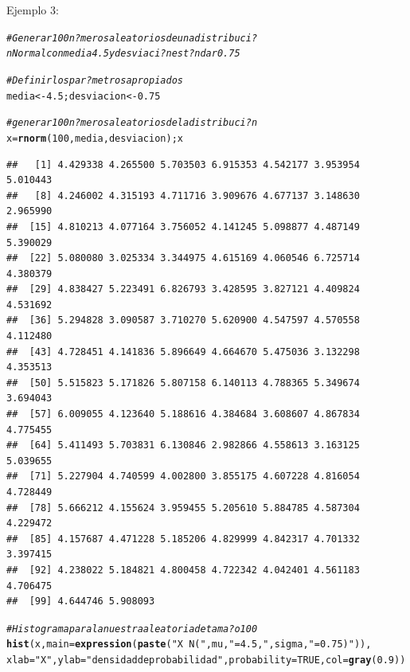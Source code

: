 \documentclass[10pt,a4paper]{article}\usepackage[]{graphicx}\usepackage[]{color}
\makeatletter
\newcommand{\hlnum}[1]{\textcolor[rgb]{0.686,0.059,0.569}{#1}}%
\newcommand{\hlstr}[1]{\textcolor[rgb]{0.192,0.494,0.8}{#1}}%
\newcommand{\hlcom}[1]{\textcolor[rgb]{0.678,0.584,0.686}{\textit{#1}}}%
\newcommand{\hlstd}[1]{\textcolor[rgb]{0.345,0.345,0.345}{#1}}%
\newcommand{\hlkwb}[1]{\textcolor[rgb]{0.69,0.353,0.396}{#1}}%
\newcommand{\hlkwc}[1]{\textcolor[rgb]{0.333,0.667,0.333}{#1}}%
\newcommand{\hlkwd}[1]{\textcolor[rgb]{0.737,0.353,0.396}{\textbf{#1}}}%
\newenvironment{kframe}{%
 \def\at@end@of@kframe{}%
 \ifinner\ifhmode%
  \def\at@end@of@kframe{\end{minipage}}%
  \begin{minipage}{\columnwidth}%
 \fi\fi%
 \def\FrameCommand##1{\hskip\@totalleftmargin \hskip-\fboxsep
 \colorbox{shadecolor}{##1}\hskip-\fboxsep
     \hskip-\linewidth \hskip-\@totalleftmargin \hskip\columnwidth}%
 \MakeFramed {\advance\hsize-\width
   \@totalleftmargin\z@ \linewidth\hsize
   \@setminipage}}%
 {\par\unskip\endMakeFramed%
 \at@end@of@kframe}
\newenvironment{knitrout}{}{} %
\makeatother
\begin{document}
Ejemplo 3: 
\begin{knitrout}
\color{fgcolor}\begin{kframe}
\begin{alltt}
\hlcom{#Generar 100 n?meros aleatorios de una distribuci?n Normal con media 4.5 y desviaci?n est?ndar 0.75 }

\hlcom{# Definir los par?metros apropiados }
\hlstd{media} \hlkwb{<-} \hlnum{4.5}\hlstd{; desviacion} \hlkwb{<-} \hlnum{0.75}

\hlcom{# generar 100 n?meros aleatorios de la distribuci?n }
\hlstd{x} \hlkwb{=} \hlkwd{rnorm}\hlstd{(}\hlnum{100}\hlstd{, media, desviacion); x}
\end{alltt}
\begin{verbatim}
##   [1] 4.429338 4.265500 5.703503 6.915353 4.542177 3.953954 5.010443
##   [8] 4.246002 4.315193 4.711716 3.909676 4.677137 3.148630 2.965990
##  [15] 4.810213 4.077164 3.756052 4.141245 5.098877 4.487149 5.390029
##  [22] 5.080080 3.025334 3.344975 4.615169 4.060546 6.725714 4.380379
##  [29] 4.838427 5.223491 6.826793 3.428595 3.827121 4.409824 4.531692
##  [36] 5.294828 3.090587 3.710270 5.620900 4.547597 4.570558 4.112480
##  [43] 4.728451 4.141836 5.896649 4.664670 5.475036 3.132298 4.353513
##  [50] 5.515823 5.171826 5.807158 6.140113 4.788365 5.349674 3.694043
##  [57] 6.009055 4.123640 5.188616 4.384684 3.608607 4.867834 4.775455
##  [64] 5.411493 5.703831 6.130846 2.982866 4.558613 3.163125 5.039655
##  [71] 5.227904 4.740599 4.002800 3.855175 4.607228 4.816054 4.728449
##  [78] 5.666212 4.155624 3.959455 5.205610 5.884785 4.587304 4.229472
##  [85] 4.157687 4.471228 5.185206 4.829999 4.842317 4.701332 3.397415
##  [92] 4.238022 5.184821 4.800458 4.722342 4.042401 4.561183 4.706475
##  [99] 4.644746 5.908093
\end{verbatim}
\begin{alltt}
\hlcom{# Histograma para la nuestra aleatoria de tama?o 100 }
\hlkwd{hist}\hlstd{(x,}\hlkwc{main}\hlstd{=}\hlkwd{expression}\hlstd{(}\hlkwd{paste}\hlstd{(}\hlstr{"X ~ N("}\hlstd{, mu,} \hlstr{" = 4.5, "}\hlstd{, sigma,} \hlstr{" = 0.75)"}\hlstd{)),}
\hlkwc{xlab}\hlstd{=}\hlstr{"X"}\hlstd{,} \hlkwc{ylab}\hlstd{=}\hlstr{"densidad de probabilidad"}\hlstd{,} \hlkwc{probability}\hlstd{=}\hlnum{TRUE}\hlstd{,} \hlkwc{col}\hlstd{=}\hlkwd{gray}\hlstd{(}\hlnum{0.9}\hlstd{))}


\end{alltt}
\end{kframe}
\end{knitrout}
\end{document}
